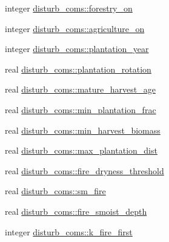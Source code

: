 \begin{DoxyCompactItemize}
integer \hyperlink{namespacedisturb__coms_ad62faf6cb6e68427671e51537fb9ef1f}{disturb\+\_\+coms\+::forestry\+\_\+on}
\item 
integer \hyperlink{namespacedisturb__coms_a42942f09e1f80adbb629f5bc82d36127}{disturb\+\_\+coms\+::agriculture\+\_\+on}
\item 
integer \hyperlink{namespacedisturb__coms_af5965ee4c60a64646fdce9039c4e8aa8}{disturb\+\_\+coms\+::plantation\+\_\+year}
\item 
real \hyperlink{namespacedisturb__coms_a376a3a991d013bb7fc01f11392b85e71}{disturb\+\_\+coms\+::plantation\+\_\+rotation}
\item 
real \hyperlink{namespacedisturb__coms_af53cc051638d63f8646b4e46eef9366a}{disturb\+\_\+coms\+::mature\+\_\+harvest\+\_\+age}
\item 
real \hyperlink{namespacedisturb__coms_a05d657ee432105896bdb7fce6388217a}{disturb\+\_\+coms\+::min\+\_\+plantation\+\_\+frac}
\item 
real \hyperlink{namespacedisturb__coms_ab882a91f3ed60ed6a1532793d166e34d}{disturb\+\_\+coms\+::min\+\_\+harvest\+\_\+biomass}
\item 
real \hyperlink{namespacedisturb__coms_a0591e026b4cc3e583767cc06fe811531}{disturb\+\_\+coms\+::max\+\_\+plantation\+\_\+dist}
\item 
real \hyperlink{namespacedisturb__coms_ac6b6e373955307b8433f33253ca71d3d}{disturb\+\_\+coms\+::fire\+\_\+dryness\+\_\+threshold}
\item 
real \hyperlink{namespacedisturb__coms_a78e160b31b155e0e0dbddbe1c6614c1c}{disturb\+\_\+coms\+::sm\+\_\+fire}
\item 
real \hyperlink{namespacedisturb__coms_a62195251813b8226366eb5ae407dd196}{disturb\+\_\+coms\+::fire\+\_\+smoist\+\_\+depth}
\item 
integer \hyperlink{namespacedisturb__coms_a867cc15822253a03763c6890d6bdabc9}{disturb\+\_\+coms\+::k\+\_\+fire\+\_\+first}
\end{DoxyCompactItemize}
